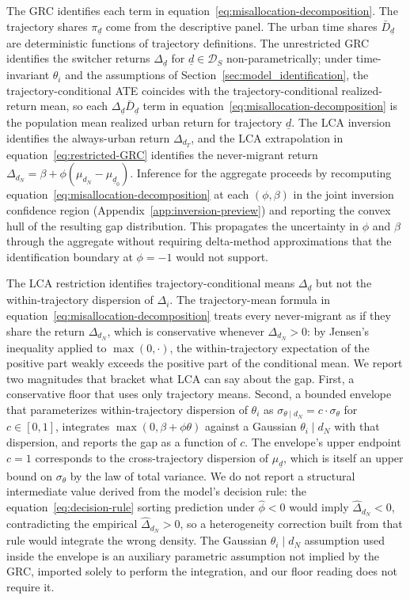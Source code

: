 The GRC identifies each term in equation~\eqref{eq:misallocation-decomposition}.
The trajectory shares $\pi_{\underline{d}}$ come from the descriptive panel.
The urban time shares $\bar{D}_{\underline{d}}$ are deterministic functions of trajectory definitions.
The unrestricted GRC identifies the switcher returns $\Delta_{\underline{d}}$ for $\underline{d} \in \mathcal{D}_S$ non-parametrically; under time-invariant $\theta_i$ and the assumptions of Section~\ref{sec:model_identification}, the trajectory-conditional ATE coincides with the trajectory-conditional realized-return mean, so each $\Delta_{\underline{d}} \bar{D}_{\underline{d}}$ term in equation~\eqref{eq:misallocation-decomposition} is the population mean realized urban return for trajectory $\underline{d}$.
The LCA inversion identifies the always-urban return $\Delta_{d_T}$, and the LCA extrapolation in equation~\eqref{eq:restricted-GRC} identifies the never-migrant return $\Delta_{d_N} = \beta + \phi(\mu_{d_N} - \mu_{\underline{d}_0})$.
Inference for the aggregate proceeds by recomputing equation~\eqref{eq:misallocation-decomposition} at each $(\phi, \beta)$ in the joint inversion confidence region (Appendix~\ref{app:inversion-preview}) and reporting the convex hull of the resulting gap distribution.
This propagates the uncertainty in $\phi$ and $\beta$ through the aggregate without requiring delta-method approximations that the identification boundary at $\phi = -1$ would not support.

The LCA restriction identifies trajectory-conditional means $\Delta_{\underline{d}}$ but not the within-trajectory dispersion of $\Delta_i$.
The trajectory-mean formula in equation~\eqref{eq:misallocation-decomposition} treats every never-migrant as if they share the return $\Delta_{d_N}$, which is conservative whenever $\Delta_{d_N} > 0$: by Jensen's inequality applied to $\max(0, \cdot)$, the within-trajectory expectation of the positive part weakly exceeds the positive part of the conditional mean.
We report two magnitudes that bracket what LCA can say about the gap.
First, a conservative floor that uses only trajectory means.
Second, a bounded envelope that parameterizes within-trajectory dispersion of $\theta_i$ as $\sigma_{\theta \mid d_N} = c \cdot \sigma_\theta$ for $c \in [0, 1]$, integrates $\max(0, \beta + \phi\theta)$ against a Gaussian $\theta_i \mid d_N$ with that dispersion, and reports the gap as a function of $c$.
The envelope's upper endpoint $c = 1$ corresponds to the cross-trajectory dispersion of $\mu_{\underline{d}}$, which is itself an upper bound on $\sigma_\theta$ by the law of total variance.
We do not report a structural intermediate value derived from the model's decision rule: the equation~\eqref{eq:decision-rule} sorting prediction under $\hat\phi < 0$ would imply $\hat\Delta_{d_N} < 0$, contradicting the empirical $\hat\Delta_{d_N} > 0$, so a heterogeneity correction built from that rule would integrate the wrong density.
The Gaussian $\theta_i \mid d_N$ assumption used inside the envelope is an auxiliary parametric assumption not implied by the GRC, imported solely to perform the integration, and our floor reading does not require it.

